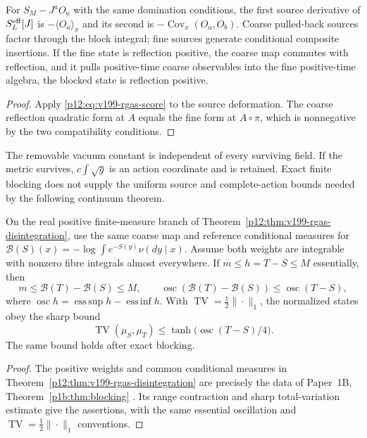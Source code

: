 \documentclass[12pt,a4paper]{article}
\begin{document}
\begin{corollary}
\label{p12:cor:v199-rgas-sources-reflection}
For \(S_M-J^aO_a\) with the same domination conditions, the first source
derivative of \(S_L^{\rm eff}[J]\) is \(-\langle O_a\rangle_x\) and its
second is \(-\operatorname{Cov}_x(O_a,O_b)\).  Coarse pulled-back sources
factor through the block integral; fine sources generate conditional
composite insertions.  If the fine state is reflection positive, the
coarse map commutes with reflection, and it pulls positive-time coarse
observables into the fine positive-time algebra, the blocked state is
reflection positive.
\end{corollary}
\begin{proof}
Apply \eqref{p12:eq:v199-rgas-score} to the source deformation.
The coarse reflection quadratic form at \(A\) equals the fine form at
\(A\circ\pi\), which is nonnegative by the two compatibility conditions.
\end{proof}
The removable vacuum constant is independent of every surviving field.
If the metric survives, \(c\int\sqrt g\) is an action coordinate and is
retained.  Exact finite blocking does not supply the uniform source and
complete-action bounds needed by the following continuum theorem.



\begin{theorem}
\label{p12:thm:v203-blocking-oscillation}
On the real positive finite-measure branch of
Theorem~\ref{p12:thm:v199-rgas-disintegration}, use the same coarse map and
reference conditional measures for
$\mathcal B(S)(x)=-\log\int e^{-S(y)}\nu(dy\mid x)$.
Assume both weights are integrable with nonzero fibre integrals almost
everywhere. If $m\le h=T-S\le M$ essentially, then
\[
 m\le\mathcal B(T)-\mathcal B(S)\le M,\qquad
 \operatorname{osc}(\mathcal B(T)-\mathcal B(S))
 \le\operatorname{osc}(T-S),
\]
where $\operatorname{osc}h=\operatorname{ess\,sup}h-
\operatorname{ess\,inf}h$. With $\operatorname{TV}=\tfrac12\|\cdot\|_1$,
the normalized states obey the sharp bound
\[
 \operatorname{TV}(\mu_S,\mu_T)
 \le\tanh\bigl(\operatorname{osc}(T-S)/4\bigr).
\]
The same bound holds after exact blocking.
\end{theorem}
\begin{proof}
The positive weights and common conditional measures in
Theorem~\ref{p12:thm:v199-rgas-disintegration} are precisely the data of
Paper~1B, Theorem~\ref{p1b:thm:blocking}
\cite{Kugelmann2026Paper1B}. Its range contraction and sharp
total-variation estimate give the assertions, with the same essential
oscillation and $\operatorname{TV}=\tfrac12\|\cdot\|_1$ conventions.
\end{proof}
\end{document}
